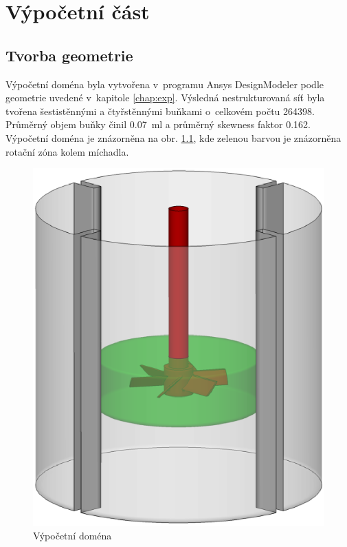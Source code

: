 \chapter{Výpočetní část}

\section{Tvorba geometrie}

Výpočetní doména byla vytvořena v~programu Ansys DesignModeler podle geometrie uvedené v~kapitole \ref{chap:exp}. Výsledná nestrukturovaná síť byla tvořena šestistěnnými a čtyřstěnnými buňkami o~celkovém počtu \num{264398}. Průměrný objem buňky činil \SI{0.07}{\milli\litre} a průměrný skewness faktor \num{0.162}. Výpočetní doména je znázorněna na obr. \ref{fig:geo}, kde zelenou barvou je znázorněna rotační zóna kolem míchadla. 

\begin{figure}[h!]
\begin{center}
\includegraphics[scale=0.5]{images/geo.eps}
\caption{Výpočetní doména}
\label{fig:geo}
\end{center}
\end{figure} 

